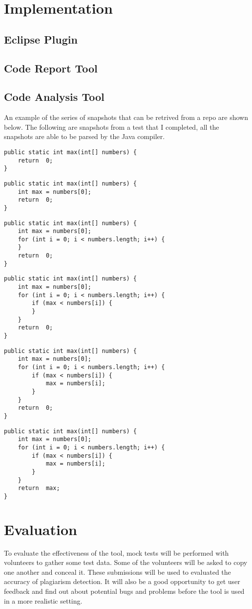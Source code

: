 \documentclass[twocolumn]{article}
\begin{document}
\section{Implementation}
\subsection{Eclipse Plugin}
\subsection{Code Report Tool}
\subsection{Code Analysis Tool}

An example of the series of snapshots that can be retrived from a repo are
shown below. The following are snapshots from a test that I completed, all the
snapshots are able to be parsed by the Java compiler.
\begin{lstlisting}[frame=single]
public static int max(int[] numbers) {
	return 	0;
}
\end{lstlisting}
\begin{lstlisting}[frame=single]
public static int max(int[] numbers) {
	int max = numbers[0];
	return 	0;
}
\end{lstlisting}
\begin{lstlisting}[frame=single]
public static int max(int[] numbers) {
	int max = numbers[0];
	for (int i = 0; i < numbers.length; i++) {
	}
	return 	0;
}
\end{lstlisting}
\begin{lstlisting}[frame=single]
public static int max(int[] numbers) {
	int max = numbers[0];
	for (int i = 0; i < numbers.length; i++) {
		if (max < numbers[i]) {
		}
	}
	return 	0;
}
\end{lstlisting}
\begin{lstlisting}[frame=single]
public static int max(int[] numbers) {
	int max = numbers[0];
	for (int i = 0; i < numbers.length; i++) {
		if (max < numbers[i]) {
			max = numbers[i];
		}
	}
	return 	0;
}
\end{lstlisting}
\begin{lstlisting}[frame=single]
public static int max(int[] numbers) {
	int max = numbers[0];
	for (int i = 0; i < numbers.length; i++) {
		if (max < numbers[i]) {
			max = numbers[i];
		}
	}
	return 	max;
}
\end{lstlisting}

\section{Evaluation}
To evaluate the effectiveness of the tool, mock tests will be performed with
volunteers to gather some test data. Some of the volunteers will be asked to
copy one another and conceal it. These submissions will be used to evaluated the
accuracy of plagiarism detection. It will also be a good opportunity to get user
feedback and find out about potential bugs and problems before the tool is used
in a more realistic setting.
\end{document}
